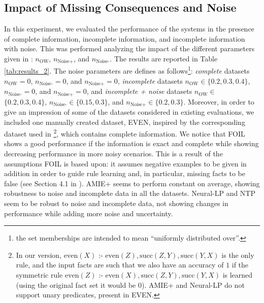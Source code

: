 \documentclass[letterpaper]{article} \usepackage{aaai20}  \usepackage{times}  \usepackage{helvet} \usepackage{courier}  \usepackage[hyphens]{url}  \usepackage{graphicx} \urlstyle{rm} \def\UrlFont{\rm}  \usepackage{graphicx}  \frenchspacing  \setlength{\pdfpagewidth}{8.5in}  \setlength{\pdfpageheight}{11in}  \usepackage{amsthm}
\theoremstyle{definition}
\newcommand{\tool}{\text{RuDaS}\xspace}
\newcommand{\nowa}{\ensuremath{n_{\text{OW}}}\xspace}
\newcommand{\nnoiseadd}{\ensuremath{n_{\text{Noise+}}}\xspace}
\newcommand{\nnoisemiss}{\ensuremath{n_{\text{Noise-}}}\xspace}
\newcommand{\ass}{\text{ :- }}
\newcommand{\expred}[1]{\textrm{#1}\xspace}
\begin{document}
\subsection{Impact of Missing Consequences and Noise}\label{sec:exp_noise}
In this experiment, we evaluated the performance of the systems in the presence of complete information, incomplete information, and incomplete information with noise. This was performed analyzing the impact of the different parameters given in \tool: $\nowa$, $\nnoiseadd$, and $\nnoisemiss$. The results are reported in Table \ref{tab:results_2}. The noise parameters are defines as follows\footnote{the set memberships are intended to mean ``uniformly distributed over''.}: 
{\it complete} datasets $\nowa=0$, $\nnoisemiss=0$, and $\nnoiseadd=0$, 
{\it incomplete} datasets $\nowa\in\{0.2,0.3,0.4\}$, $\nnoisemiss=0$, and $\nnoiseadd=0$, and 
{\it incomplete + noise} datasets $\nowa\in$ \\$\{0.2,0.3, 0.4\}$, $\nnoisemiss\in\{0.15,0.3\}$, and $\nnoiseadd\in\{0.2,0.3\}$. 
Moreover, in order to give an impression of some of the datasets considered in existing evaluations, we included one manually created dataset, EVEN, inspired by the corresponding dataset used in  \cite{EGre-jair18:learning-explanatory-rules}\footnote{In our version, 
$\expred{even}(X) \ass \expred{even}(Z),\expred{succ}(Z,Y),\expred{succ}(Y,X)$ 
is the only rule,
and the input facts are such that we also have an  accuracy of $1$ if the symmetric rule $\expred{even}(Z) \ass \expred{even}(X), \expred{succ}(Z,Y),\expred{succ}(Y,X)$ is learned (using the original fact set it would be $0$). AMIE+ and Neural-LP do not support unary predicates, present in EVEN.}, which contains complete information.
We notice that FOIL shows a good performance if the information is exact and complete while showing decreasing performance in more noisy scenarios. 
This is a result of the assumptions FOIL is based upon: it assumes negative examples to be given in addition in order to guide rule learning and, in particular, missing facts to be false (see Section 4.1 in \cite{Quinlan-ML90:foil}).
AMIE+ seems to perform constant on average, showing
robustness to noise and incomplete data in all the datasets.
Neural-LP and NTP seem to be robust to noise and incomplete data, not showing changes in performance while adding more noise and uncertainty.
\end{document}
